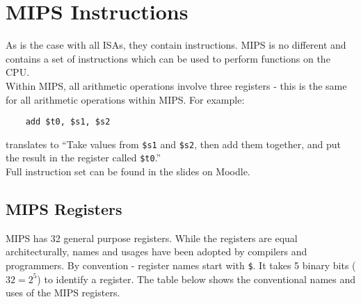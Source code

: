 \section{MIPS Instructions}
As is the case with all ISAs, they contain instructions. MIPS is no different and contains a set of instructions which can be used to perform functions on the CPU.\\

Within MIPS, all arithmetic operations involve three registers - this is the same for all arithmetic operations within MIPS. For example:
\begin{verbatim}
    add $t0, $s1, $s2
\end{verbatim}
translates to ``Take values from \verb|$s1| and \verb|$s2|, then add them together, and put the result in the register called \verb|$t0|.''\\

Full instruction set can be found in the slides on Moodle. 

\subsection{MIPS Registers}
MIPS has 32 general purpose registers. While the registers are equal architecturally, names and usages have been adopted by compilers and programmers. By convention - register names start with \verb|$|. It takes 5 binary bits ($32=2^5$) to identify a register. The table below shows the conventional names and uses of the MIPS registers.

